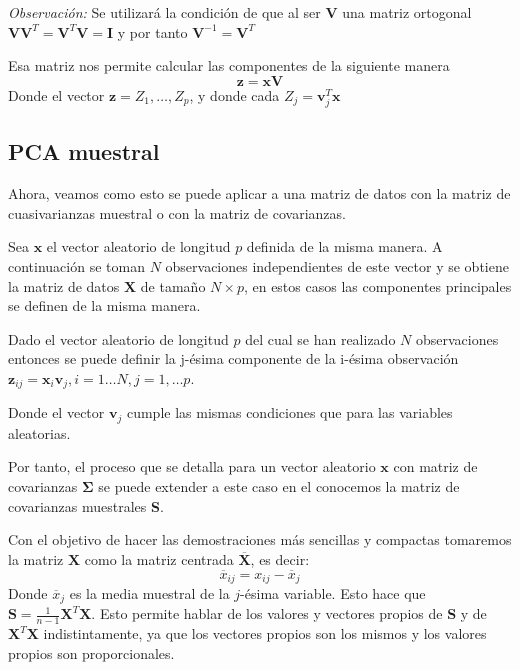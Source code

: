 \noindent \emph{Observación: }Se utilizará la condición de que al ser $\mathbf{V}$ una matriz ortogonal $\mathbf{VV}^T=\mathbf{V}^T\mathbf{V}=\mathbf{I}$ y por tanto $\mathbf{V}^{-1}=\mathbf{V}^T$

\noindent Esa matriz nos permite calcular las componentes de la siguiente manera
\begin{equation}
\mathbf{z}=\mathbf{x} \mathbf{V}
\end{equation} 
\noindent Donde el vector $\mathbf{z}=Z_1,\ldots, Z_p$, y donde cada $Z_j=\mathbf{v}_j^T\mathbf{x}$
\subsection{PCA muestral}
\noindent Ahora, veamos como esto se puede aplicar a una matriz de datos con la matriz de cuasivarianzas muestral o con la matriz de covarianzas. 

\noindent Sea $\mathbf{x}$ el vector aleatorio de longitud $p$ definida de la misma manera. A continuación se toman $N$ observaciones independientes de este vector y se obtiene la matriz de datos $\mathbf{X}$ de tamaño $N\times p$, en estos casos las componentes principales se definen de la misma manera. 



\begin{defi}
Dado el vector aleatorio de longitud $p$ del cual se han realizado $N$ observaciones entonces se puede definir la j-ésima componente de la i-ésima  observación $\mathbf{z}_{ij}=\mathbf{x}_i\mathbf{v}_j, i=1\ldots N,j=1,\ldots p$. 

\noindent Donde el vector $\mathbf{v}_j$ cumple las mismas condiciones que para las variables aleatorias. 
\end{defi}

\noindent Por tanto, el proceso que se detalla para un vector aleatorio $\mathbf{x}$ con matriz de covarianzas $\mathbf{\Sigma}$ se puede extender a este caso en el conocemos la matriz de covarianzas muestrales \textbf{S}.

\noindent Con el objetivo de hacer las demostraciones más sencillas y compactas tomaremos la matriz $\textbf{X}$ como la matriz centrada $\overline{\textbf{X}}$, es decir: 
\begin{equation}
\overline{x}_{ij}=x_{ij}-\overline{x}_j
\end{equation}
Donde $\overline{x}_j$ es la media muestral de la $j$-ésima variable. Esto hace que $\textbf{S}=\frac{1}{n-1}\textbf{X}^T\textbf{X}$. Esto permite hablar de los valores y vectores propios de \textbf{S} y de $\textbf{X}^T \textbf{X}$ indistintamente, ya que los vectores propios son los mismos y los valores propios son proporcionales. 


